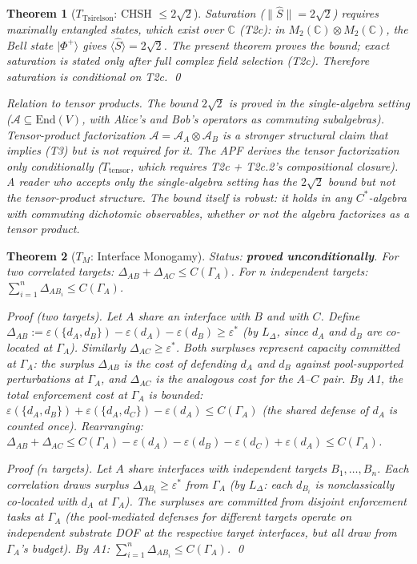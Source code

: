 \documentclass[11pt,a4paper]{article}
\newtheorem{theorem}{Theorem}[section]
\theoremstyle{definition}
\newcommand{\eps}{\varepsilon}
\newcommand{\End}{\mathrm{End}}
\begin{document}
\begin{theorem}[$T_{\mathrm{Tsirelson}}$: CHSH $\le 2\sqrt{2}$]
\textit{Saturation} ($\|\hat{S}\| = 2\sqrt{2}$) requires maximally entangled states, which exist over $\mathbb{C}$ (T2c): in $M_2(\mathbb{C}) \otimes M_2(\mathbb{C})$, the Bell state $|\Phi^+\rangle$ gives $\langle \hat{S} \rangle = 2\sqrt{2}$.  The present theorem proves the bound; exact saturation is stated only after full complex field selection (T2c).  Therefore saturation is conditional on T2c.  \qed

\smallskip\noindent\textit{Relation to tensor products.}  The bound $2\sqrt{2}$ is proved in the single-algebra setting ($\mathcal{A} \subseteq \End(V)$, with Alice's and Bob's operators as commuting subalgebras).  Tensor-product factorization $\mathcal{A} = \mathcal{A}_A \otimes \mathcal{A}_B$ is a \emph{stronger} structural claim that implies (T3) but is not required for it.  The APF derives the tensor factorization only conditionally ($T_{\mathrm{tensor}}$, which requires T2c + T2c.2's compositional closure).  A reader who accepts only the single-algebra setting has the $2\sqrt{2}$ bound but not the tensor-product structure.  The bound itself is robust: it holds in any $C^*$-algebra with commuting dichotomic observables, whether or not the algebra factorizes as a tensor product.
\end{theorem}

\begin{theorem}[$T_M$: Interface Monogamy]\label{thm:TM}
\textit{Status: \textbf{proved unconditionally}.}  For two correlated targets: $\Delta_{AB} + \Delta_{AC} \le C(\Gamma_A)$.  For $n$ independent targets: $\sum_{i=1}^n \Delta_{A B_i} \le C(\Gamma_A)$.

\smallskip\noindent\textit{Proof (two targets).}  Let $A$ share an interface with $B$ and with $C$.  Define $\Delta_{AB} := \eps(\{d_A, d_B\}) - \eps(d_A) - \eps(d_B) \ge \eps^*$ (by $L_\Delta$, since $d_A$ and $d_B$ are co-located at $\Gamma_A$).  Similarly $\Delta_{AC} \ge \eps^*$.  Both surpluses represent capacity committed at $\Gamma_A$: the surplus $\Delta_{AB}$ is the cost of defending $d_A$ and $d_B$ against pool-supported perturbations at $\Gamma_A$, and $\Delta_{AC}$ is the analogous cost for the $A$--$C$ pair.  By A1, the total enforcement cost at $\Gamma_A$ is bounded: $\eps(\{d_A, d_B\}) + \eps(\{d_A, d_C\}) - \eps(d_A) \le C(\Gamma_A)$ (the shared defense of $d_A$ is counted once).  Rearranging: $\Delta_{AB} + \Delta_{AC} \le C(\Gamma_A) - \eps(d_A) - \eps(d_B) - \eps(d_C) + \eps(d_A) \le C(\Gamma_A)$.

\smallskip\noindent\textit{Proof ($n$ targets).}  Let $A$ share interfaces with independent targets $B_1, \ldots, B_n$.  Each correlation draws surplus $\Delta_{AB_i} \ge \eps^*$ from $\Gamma_A$ (by $L_\Delta$: each $d_{B_i}$ is nonclassically co-located with $d_A$ at $\Gamma_A$).  The surpluses are committed from disjoint enforcement tasks at $\Gamma_A$ (the pool-mediated defenses for different targets operate on independent substrate DOF at the respective target interfaces, but all draw from $\Gamma_A$'s budget).  By A1: $\sum_{i=1}^n \Delta_{AB_i} \le C(\Gamma_A)$.  \qed
\end{theorem}
\end{document}
